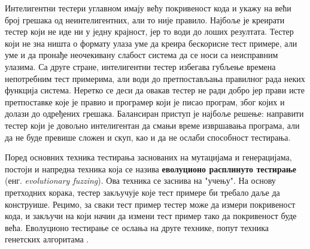 \documentclass[12pt,oneside]{memoir}
\begin{document}
Интелигентни тестери углавном имају већу покривеност кода и укажу на већи број грешака од неинтелигентних, али то није правило. Најбоље је креирати тестер који не иде ни у једну крајност, јер то води до лоших резултата. Тестер који не зна ништа о формату улаза уме да креира бескорисне тест примере, али уме и да пронађе неочекивану слабост система да се носи са неисправним улазима. Са друге стране, интелигентни тестер избегава губљење времена непотребним тест примерима, али води до претпостављања правилног рада неких функција система. Неретко се деси да овакав тестер не ради добро јер прави исте претпоставке које је правио и програмер који је писао програм, због којих и долази до одређених грешака. Балансиран приступ је најбоље решење: направити тестер који је довољно интелигентан да смањи време извршавања програма, али да не буде превише сложен и скуп, као и да не ослаби способност тестирања.

Поред основних техника тестирања заснованих на мутацијама и генерацијама, постоји и напредна техника која се назива \textbf{еволуционо расплинуто тестирање} (енг. \textit{evolutionary fuzzing}). Ова техника се заснива на "учењу". На основу претходних корака, тестер закључује које тест примере би требало даље да конструише. Рецимо, за сваки тест пример тестер може да измери покривеност кода, и закључи на који начин да измени тест пример тако да покривеност буде већа. Еволуционо тестирање се ослања на друге технике, попут техника генетских алгоритама \cite{fuzzing, 15minuteGuide}.
\end{document}

